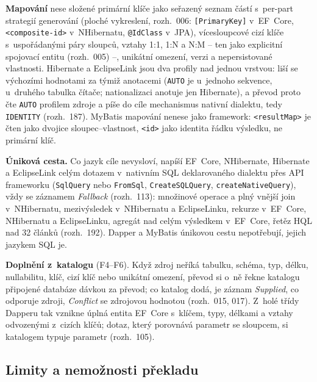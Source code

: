 \documentclass{article}
\begin{document}
\textbf{Mapování} nese složené primární klíče jako seřazený seznam částí s~per-part strategií generování (ploché vykreslení, rozh.~006: \texttt{[PrimaryKey]} v~EF~Core, \texttt{<composite-id>} v~NHibernatu, \texttt{@IdClass} v~JPA), vícesloupcové cizí klíče s~uspořádanými páry sloupců, vztahy 1:1, 1:N a N:M -- ten jako explicitní spojovací entitu (rozh.~005) --, unikátní omezení, verzi a nepersistované vlastnosti. Hibernate a EclipseLink jsou dva profily nad jednou vrstvou: liší se výchozími hodnotami za týmiž anotacemi (\texttt{AUTO} je u~jednoho sekvence, u~druhého tabulka čítače; nationalizaci anotuje jen Hibernate), a převod proto čte \texttt{AUTO} profilem zdroje a píše do cíle mechanismus nativní dialektu, tedy \texttt{IDENTITY} (rozh.~187). MyBatis mapování nenese jako framework: \texttt{<resultMap>} je čten jako dvojice sloupec--vlastnost, \texttt{<id>} jako identita řádku výsledku, ne primární klíč.

\textbf{Úniková cesta.} Co jazyk cíle nevysloví, napíší EF~Core, NHibernate, Hibernate a EclipseLink celým dotazem v~nativním SQL deklarovaného dialektu přes API frameworku (\texttt{SqlQuery} nebo \texttt{FromSql}, \texttt{CreateSQLQuery}, \texttt{createNativeQuery}), vždy se záznamem \emph{Fallback} (rozh.~113): množinové operace a plný vnější join v~NHibernatu, mezivýsledek v~NHibernatu a EclipseLinku, rekurze v~EF~Core, NHibernatu a EclipseLinku, agregát nad celým výsledkem v~EF~Core, řetěz HQL nad 32 článků (rozh.~192). Dapper a MyBatis únikovou cestu nepotřebují, jejich jazykem SQL je.

\textbf{Doplnění z~katalogu} (F4--F6). Když zdroj neříká tabulku, schéma, typ, délku, nullabilitu, klíč, cizí klíč nebo unikátní omezení, převod si o~ně řekne katalogu připojené databáze dávkou za převod; co katalog dodá, je záznam \emph{Supplied}, co odporuje zdroji, \emph{Conflict} se zdrojovou hodnotou (rozh.~015, 017). Z~holé třídy Dapperu tak vznikne úplná entita EF~Core s~klíčem, typy, délkami a vztahy odvozenými z~cizích klíčů; dotaz, který porovnává parametr se sloupcem, si katalogem typuje parametr (rozh.~105).

\subsection{Limity a nemožnosti překladu}\label{sec:limity}
\end{document}
